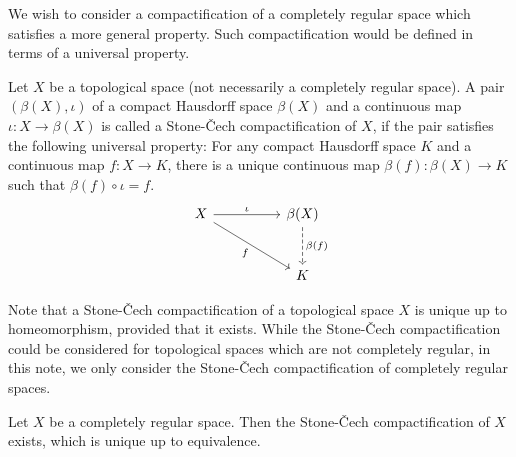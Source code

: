 We wish to consider a compactification of a completely regular space which satisfies a more general property.
Such compactification would be defined in terms of a universal property.

\begin{defi}\label{SC-cptf}
    Let $X$ be a topological space (not necessarily a completely regular space).
    A pair $(\beta(X), \iota)$ of a compact Hausdorff space $\beta(X)$ and a continuous map $\iota: X\rightarrow \beta(X)$ is called a Stone-\v{C}ech compactification of $X$, if the pair satisfies the following universal property:
    For any compact Hausdorff space $K$ and a continuous map $f: X\rightarrow K$, there is a unique continuous map $\beta(f): \beta(X)\rightarrow K$ such that $\beta(f)\circ\iota = f$.
    \begin{equation*}
        \begin{tikzcd}[row sep=large, column sep=huge]
            X
            \arrow[dr, "f"']
            \arrow[r, "\iota"] &
            \beta(X)
            \arrow[d, "\beta(f)", dashed] \\
            & K
        \end{tikzcd}
    \end{equation*}
\end{defi}

Note that a Stone-\v{C}ech compactification of a topological space $X$ is unique up to homeomorphism, provided that it exists.
While the Stone-\v{C}ech compactification could be considered for topological spaces which are not completely regular, in this note, we only consider the Stone-\v{C}ech compactification of completely regular spaces.
\begin{thm}
    Let $X$ be a completely regular space.
    Then the Stone-\v{C}ech compactification of $X$ exists, which is unique up to equivalence.
\end{thm}

